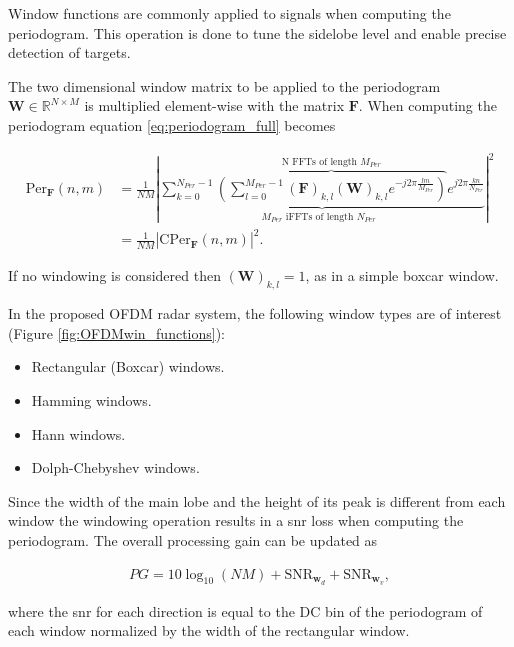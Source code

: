 	Window functions are commonly applied to signals when computing the periodogram. This operation is done to tune the sidelobe level and enable precise detection of targets. 
	
	
	The two dimensional window matrix to be applied to the periodogram $\mathbf W \in \mathbb{R}^{N\times M}$ is multiplied element-wise with the matrix $\mathbf F$. When computing the periodogram equation \ref{eq:periodogram_full} becomes
	
	
	   \begin{align*}
		\text{Per}_{\mathbf F}(n,m) &= \frac{1}{NM} \left| \underbrace{ \sum_{k=0}^{N_{Per}-1}  \overbrace{\left( \sum_{l=0}^{M_{Per}-1} (\bm{F})_{k,l} (\mathbf W)_{k,l} e^{-j2\pi \frac{lm}{M_{Per}}} \right)}^{\text{N FFTs of length $M_{Per}$}}  e^{j2\pi\frac{kn}{N_{Per}}}}_{ \text{$M_{Per}$ iFFTs of length $N_{Per}$ }} \right| ^ 2\\
		&= \frac{1}{NM} \left| \text{CPer}_{\bm{F}}(n,m) \right| ^ 2.
		\end{align*}
	 
	 If no windowing is considered then $(\mathbf W)_{k,l} = 1$, as in a simple boxcar window.
	 
	 In the proposed OFDM radar system, the following window types are of interest (Figure \ref{fig:OFDMwin_functions}):
	 
	 \begin{itemize}
	 	\item Rectangular (Boxcar) windows.
	 	\item Hamming windows.
	 	\item Hann windows.
	 	\item Dolph-Chebyshev windows.
	 \end{itemize}
	
	
	Since the width of the main lobe and the height of its peak is different from each window the windowing operation results in a \gls{snr} loss when computing the periodogram.
	The overall processing gain can be updated as
	
	\begin{align*}
		PG = 10\log_{10}(NM) + \text{SNR}_{\bm{w}_d} + \text{SNR}_{\bm{w}_v},
	\end{align*}
	
	where the \gls{snr} for each direction is equal to the DC bin of the periodogram of each window normalized by the width of the rectangular window.
	

